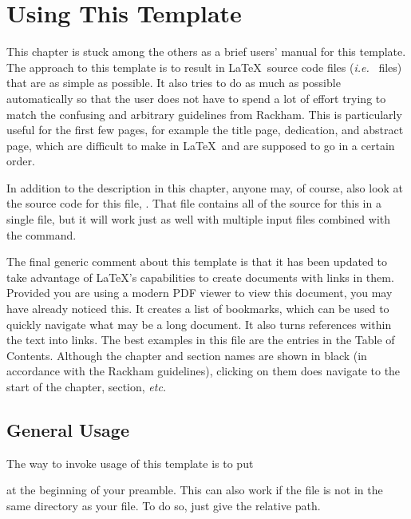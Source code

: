 
\chapter{Using This Template}   \label{chap:manual}
This chapter is stuck among the others as a brief users' manual for this
template.  The approach to this template is to result in \LaTeX~source
code files (\textit{i.e.}~ files) that are as simple as
possible.  It also tries to do as much as possible automatically so that
the user does not have to spend a lot of effort trying to match the
confusing and arbitrary guidelines from Rackham.  This is particularly
useful for the first few pages, for example the title page, dedication,
and abstract page, which are difficult to make in \LaTeX~and are
supposed to go in a certain order.

In addition to the description in this chapter, anyone may, of course,
also look at the source code for this file, .
That file contains all of the source for this  in a single
file, but it will work just as well with multiple input files combined
with the \verb|| command.

The final generic comment about this template is that it has been
updated to take advantage of \LaTeX's capabilities to create documents
with links in them.  Provided you are using a modern PDF viewer to view
this document, you may have already noticed this.  It creates a list of
bookmarks, which can be used to quickly navigate what may be a long
document.  It also turns references within the text into links.  The
best examples in this file are the entries in the Table of Contents.
Although the chapter and section names are shown in black (in accordance
with the Rackham guidelines), clicking on them does navigate to the
start of the chapter, section, \textit{etc.}

\section{General Usage}
The way to invoke usage of this template is to put
at the beginning of your preamble.  This can also work if the
 file is not in the same directory as your
 file.  To do so, just give the relative path.

